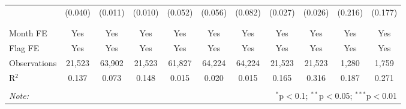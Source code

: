 \begin{table}[H]
\begin{tabular}{@{\extracolsep{1pt}}lcccccccccc}
  & (0.040) & (0.011) & (0.010) & (0.052) & (0.056) & (0.082) & (0.027) & (0.026) & (0.216) & (0.177) \\ 
  & & & & & & & & & & \\ 
\hline \\[-1.8ex] 
Month FE & Yes & Yes & Yes & Yes & Yes & Yes & Yes & Yes & Yes & Yes \\ 
Flag FE & Yes & Yes & Yes & Yes & Yes & Yes & Yes & Yes & Yes & Yes \\ 
Observations & 21,523 & 63,902 & 21,523 & 61,827 & 64,224 & 64,224 & 21,523 & 21,523 & 1,280 & 1,759 \\ 
R$^{2}$ & 0.137 & 0.073 & 0.148 & 0.015 & 0.020 & 0.015 & 0.165 & 0.316 & 0.187 & 0.271 \\ 
\hline 
\hline \\[-1.8ex] 
\textit{Note:}  & \multicolumn{10}{r}{$^{*}$p$<$0.1; $^{**}$p$<$0.05; $^{***}$p$<$0.01} \\ 
\end{tabular} 
\end{table} 
